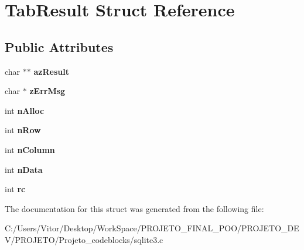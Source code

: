 \hypertarget{struct_tab_result}{\section{Tab\-Result Struct Reference}
\label{struct_tab_result}
}
\subsection*{Public Attributes}
\begin{DoxyCompactItemize}
\item 
\hypertarget{struct_tab_result_a7446a22a7b39c17e447c65ba200490a6}{char $\ast$$\ast$ {\bfseries az\-Result}}\label{struct_tab_result_a7446a22a7b39c17e447c65ba200490a6}

\item 
\hypertarget{struct_tab_result_a6e7104bb622be05f16b6470dbb68a6c7}{char $\ast$ {\bfseries z\-Err\-Msg}}\label{struct_tab_result_a6e7104bb622be05f16b6470dbb68a6c7}

\item 
\hypertarget{struct_tab_result_a6a1d5bc64a1eeef54b56cb2602b663b2}{int {\bfseries n\-Alloc}}\label{struct_tab_result_a6a1d5bc64a1eeef54b56cb2602b663b2}

\item 
\hypertarget{struct_tab_result_ae803d6f07364c9e03bee8abd13056e1b}{int {\bfseries n\-Row}}\label{struct_tab_result_ae803d6f07364c9e03bee8abd13056e1b}

\item 
\hypertarget{struct_tab_result_a44237b9ab33cdbca7a5a158470ebcaa3}{int {\bfseries n\-Column}}\label{struct_tab_result_a44237b9ab33cdbca7a5a158470ebcaa3}

\item 
\hypertarget{struct_tab_result_a959e8dd3348f76e4cdabad9c89ee62d1}{int {\bfseries n\-Data}}\label{struct_tab_result_a959e8dd3348f76e4cdabad9c89ee62d1}

\item 
\hypertarget{struct_tab_result_a44bb015ce660ed3f987e324919d73f4d}{int {\bfseries rc}}\label{struct_tab_result_a44bb015ce660ed3f987e324919d73f4d}

\end{DoxyCompactItemize}


The documentation for this struct was generated from the following file\-:\begin{DoxyCompactItemize}
\item 
C\-:/\-Users/\-Vitor/\-Desktop/\-Work\-Space/\-P\-R\-O\-J\-E\-T\-O\-\_\-\-F\-I\-N\-A\-L\-\_\-\-P\-O\-O/\-P\-R\-O\-J\-E\-T\-O\-\_\-\-D\-E\-V/\-P\-R\-O\-J\-E\-T\-O/\-Projeto\-\_\-codeblocks/sqlite3.\-c\end{DoxyCompactItemize}
